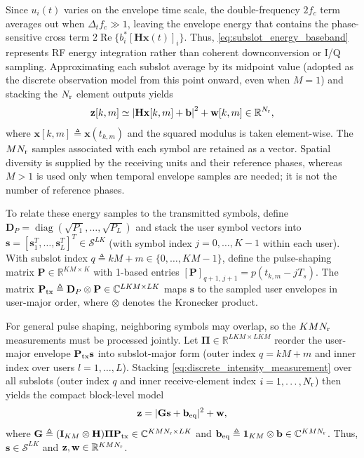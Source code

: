 \documentclass[journal]{IEEEtran}
\begin{document}
Since $u_i(t)$ varies on the envelope time scale, the double-frequency $2f_c$ term averages out when $\Delta_t f_c \gg 1$, leaving the envelope energy that contains the phase-sensitive cross term $2\operatorname{Re}\{b_i^*[\mathbf{H}\mathbf{x}(t)]_i\}$. Thus, \eqref{eq:subslot_energy_baseband} represents RF energy integration rather than coherent downconversion or I/Q sampling. Approximating each subslot average by its midpoint value (adopted as the discrete observation model from this point onward, even when $M=1$) and stacking the $N_{\rm r}$ element outputs yields
\begin{equation}
\mathbf{z}[k,m]
\simeq
\left|
\mathbf{H}\mathbf{x}[k,m] + \mathbf{b}
\right|^2
+
\mathbf{w}[k,m]
\in \mathbb{R}^{N_{\rm r}},
\label{eq:discrete_intensity_measurement}
\end{equation}
where $\mathbf{x}[k,m] \triangleq \mathbf{x}(t_{k,m})$ and the squared modulus is taken element-wise. The $MN_{\rm r}$ samples associated with each symbol are retained as a vector. Spatial diversity is supplied by the receiving units and their reference phases, whereas $M>1$ is used only when temporal envelope samples are needed; it is not the number of reference phases.

To relate these energy samples to the transmitted symbols, define $\mathbf D_P=\operatorname{diag}(\sqrt{P_1},\ldots,\sqrt{P_L})$ and stack the user symbol vectors into $\mathbf s=[\mathbf s_1^T,\ldots,\mathbf s_L^T]^T \in \mathcal S^{LK}$ (with symbol index $j=0,\ldots,K-1$ within each user). With subslot index $q \triangleq kM+m \in \{0,\ldots,KM-1\}$, define the pulse-shaping matrix $\mathbf P \in \mathbb{R}^{KM \times K}$ with 1-based entries $[\mathbf P]_{q+1,\,j+1}=p(t_{k,m}-jT_s)$. The matrix $\mathbf P_{\rm tx}\triangleq\mathbf D_P\otimes\mathbf P\in \mathbb C^{LKM\times LK}$ maps $\mathbf s$ to the sampled user envelopes in user-major order, where $\otimes$ denotes the Kronecker product.

For general pulse shaping, neighboring symbols may overlap, so the $KMN_{\rm r}$ measurements must be processed jointly. Let $\boldsymbol\Pi \in \mathbb{R}^{LKM \times LKM}$ reorder the user-major envelope $\mathbf P_{\rm tx}\mathbf s$ into subslot-major form (outer index $q = kM+m$ and inner index over users $l=1,\ldots,L$). Stacking \eqref{eq:discrete_intensity_measurement} over all subslots (outer index $q$ and inner receive-element index $i=1,\ldots,N_{\rm r}$) then yields the compact block-level model
\begin{equation}
\mathbf z=|\mathbf G\mathbf s+\mathbf b_{\rm eq}|^2+\mathbf w,
\label{eq:block_level_intensity_model}
\end{equation}
where $\mathbf G\triangleq(\mathbf I_{KM}\otimes\mathbf H) \boldsymbol\Pi\mathbf P_{\rm tx}\in\mathbb C^{KMN_{\rm r}\times LK}$ and $\mathbf b_{\rm eq}\triangleq\mathbf 1_{KM}\otimes\mathbf b \in \mathbb{C}^{KMN_{\rm r}}$. Thus, $\mathbf s\in\mathcal S^{LK}$ and $\mathbf z,\mathbf w\in\mathbb R^{KMN_{\rm r}}$.
\end{document}
